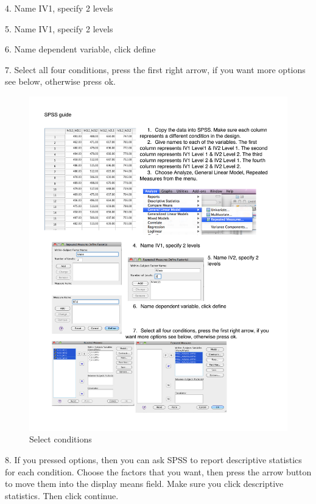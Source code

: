 4. Name IV1, specify 2 levels

5. Name IV1, specify 2 levels

6. Name dependent variable, click define

7. Select all four conditions, press the first right arrow, if you want more options see below, otherwise press ok.

\begin{figure}
      \includegraphics[width=\linewidth]{LabmanualFigures/SPSS10.pdf}
      \caption{Select conditions}
      \label{fig:SPSS10}
\end{figure}

8. If you pressed options, then you can ask SPSS to report descriptive statistics for each condition. Choose the factors that you want, then press the arrow button to move them into the display means field. Make sure you click descriptive statistics. Then click continue.

